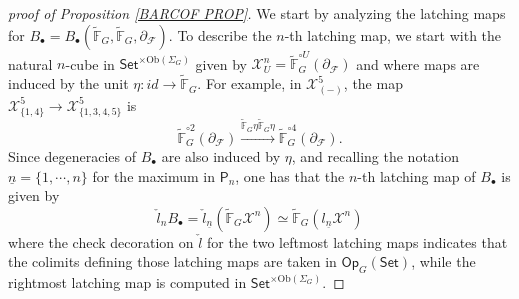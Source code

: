 \documentclass[a4paper,10pt
,draft
]{article}%
\numberwithin{equation}{section}
\numberwithin{figure}{section}
\theoremstyle{definition} %
\newcommand{\1}{\ensuremath{\mathbbm 1}}%
\begin{document}
\begin{proof}[proof of Proposition \ref{BARCOF PROP}]
We start by analyzing the latching maps
for 
$B_{\bullet}
=
B_{\bullet}(\widetilde{\mathbb{F}}_G,
\widetilde{\mathbb{F}}_G,
\partial_{\mathcal{F}})
$.
To describe the $n$-th latching map, we start with the natural $n$-cube in 
$\mathsf{Set}^{\times \text{Ob}(\Sigma_G)}$ 
given by
$\mathcal{X}^n_U = 
\widetilde{\mathbb{F}}_G^{\circ U}
(\partial_{\mathcal{F}})$
and where maps 
are induced by the unit
$\eta \colon id \to \widetilde{\mathbb{F}}_G$.
For example, in 
$\mathcal{X}^5_{(\minus)}$,
the map 
$\mathcal{X}^5_{\{1,4\}} \to \mathcal{X}^5_{\{1,3,4,5\}}$
is 
\[
\widetilde{\mathbb{F}}_G^{\circ 2}
(\partial_{\mathcal{F}})
\xrightarrow{
\widetilde{\mathbb{F}}_G
\eta
\widetilde{\mathbb{F}}_G
\eta}
\widetilde{\mathbb{F}}_G^{\circ 4}
(\partial_{\mathcal{F}}).
\]
Since degeneracies of $B_{\bullet}$
are also induced by $\eta$,
and recalling the notation $\underline{n}=\{1,\cdots,n\}$ for the maximum in $\mathsf{P}_n$,
one has that the $n$-th latching map of $B_{\bullet}$ is given by
\begin{equation}\label{MONLATCH EQ}
	\check{l}_n B_{\bullet} = 
	\check{l}_{\underline{n}}
	(\widetilde{\mathbb{F}}_G
	\mathcal{X}^n) \simeq
	\widetilde{\mathbb{F}}_G
	(l_{\underline{n}} \mathcal{X}^n)
\end{equation}
where the check decoration on $\check{l}$
for the two leftmost latching maps indicates that the colimits defining those latching maps are taken 
in $\mathsf{Op}_{G}(\mathsf{Set})$, while the rightmost latching map is computed in 
$\mathsf{Set}^{\times \text{Ob}(\Sigma_G)}$.


\end{proof}
\end{document}

